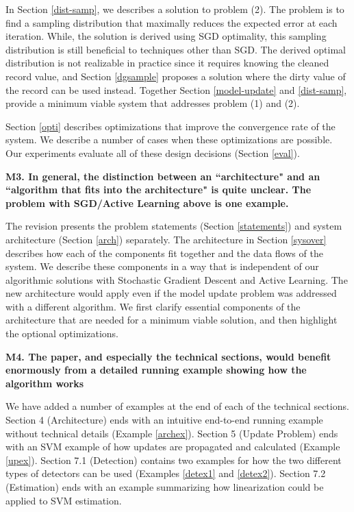 In Section \ref{dist-samp}, we describes a solution to problem (2).
The problem is to find a sampling distribution that maximally reduces the expected error
at each iteration.
While, the solution is derived using SGD optimality, this sampling distribution is still beneficial to techniques other than SGD.
The derived optimal distribution is not realizable in practice since it requires knowing the cleaned record value, and Section \ref{dgsample} proposes a solution where the dirty value of the record can be used instead.
Together Section \ref{model-update} and \ref{dist-samp}, provide a minimum viable system that addresses problem (1) and (2).

Section \ref{opti} describes optimizations that improve the convergence rate of the system.
We describe a number of cases when these optimizations are possible.
Our experiments evaluate all of these design decisions (Section \ref{eval}).

\vspace{0.5em}

\noindent\textbf{M3. In general, the distinction between an ``architecture" and an ``algorithm that fits into the architecture" is quite unclear. The problem with SGD/Active Learning above is one example.}

The revision presents the problem statements (Section \ref{statements}) and system architecture (Section \ref{arch}) separately.
The architecture in Section \ref{sysover} describes how each of the components fit together and the data flows of the system.
We describe these components in a way that is independent of our algorithmic solutions with Stochastic Gradient Descent and Active Learning.
The new architecture would apply even if the model update problem was addressed with a different algorithm.
We first clarify essential components of the architecture that are needed for a minimum viable solution, and then highlight the optional optimizations.

\vspace{0.5em}

\noindent\textbf{M4. The paper, and especially the technical sections, would benefit enormously from a detailed running example showing how the algorithm works}

We have added a number of examples at the end of each of the technical sections. Section 4 (Architecture) ends with an intuitive end-to-end running example without technical details (Example \ref{archex}).
Section 5 (Update Problem) ends with an SVM example of how updates are propagated and calculated (Example \ref{upex}).
Section 7.1 (Detection) contains two examples for how the two different types of detectors can be used (Examples \ref{detex1} and \ref{detex2}).
Section 7.2 (Estimation) ends with an example summarizing how linearization could be applied to SVM estimation.

